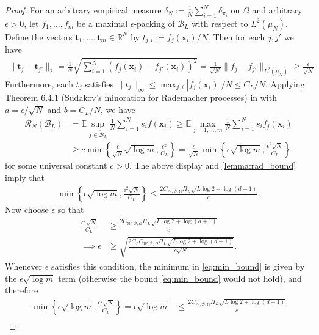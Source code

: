 \documentclass{article}
\def\vt{{\bm{t}}}
\def\vx{{\bm{x}}}
\def\cB{{\mathcal{B}}}
\def\cR{{\mathcal{R}}}
\def\cW{{\mathcal{W}}}
\def\bE{{\mathbb{E}}}
\newcommand{\R}{\mathbb{R}}
\begin{document}
\begin{appendices}
\begin{proof}
    For an arbitrary empirical measure $\delta_N := \frac{1}{N} \sum_{i=1}^N \delta_{\vx_i}$ on $\Omega$ and arbitrary $\epsilon > 0$, let $f_1, \dots, f_m$ be a maximal $\epsilon$-packing of $\cB_L$ with respect to $L^2(\mu_N)$. Define the vectors $\vt_1, \dots, \vt_m \in \R^N$ by $t_{j,i} := f_j(\vx_i)/N$. Then for each $j,j'$ we have
\begin{align}
    \| \vt_j - \vt_{j'} \|_2 = \frac{1}{N} \sqrt{\sum_{i=1}^N \left( f_j(\vx_i) - f_{j'}(\vx_i) \right)^2} = \frac{1}{\sqrt{N}} \| f_j - f_{j'} \|_{L^2(\mu_N)} \geq \frac{\epsilon}{\sqrt{N}}
\end{align}
Furthermore, each $t_j$ satisfies $\| t_j \|_\infty \leq \max_{j,i} |f_j(\vx_i)|/N \leq C_L/N$. Applying Theorem 6.4.1 (Sudakov's minoration for Rademacher processes) in \cite{talagrand2021upper} with $a = \epsilon/\sqrt{N}$ and $b = C_L/N$, we have
\begin{align}
    \cR_N(\cB_L) &= \bE \sup_{f \in \widetilde{\cB}_L} \frac{1}{N} \sum_{i=1}^N s_i f(\vx_i) \geq \bE \max_{j=1, \dots, m} \frac{1}{N} \sum_{i=1}^N s_i f_j(\vx_i) \\
    &\geq c \min \left\{ \frac{\epsilon}{\sqrt{N}} \sqrt{\log m}, \frac{\epsilon^2}{C_L} \right\} = \frac{c}{\sqrt{N}} \min \left\{ \epsilon \sqrt{\log m}, \frac{\epsilon^2 \sqrt{N}}{C_L} \right\}
\end{align}
for some universal constant $c > 0$. The above display and \cref{lemma:rad_bound} imply that
\begin{align} \label{eq:min_bound}
     \min \left\{ \epsilon \sqrt{\log m}, \frac{\epsilon^2 \sqrt{N}}{C_L} \right\} \leq \frac{2 C_{\cW, \cB, \Omega} \Pi_L \sqrt{L \log 2 + \log(d+1)}}{c}.
\end{align}
Now choose $\epsilon$ so that
\begin{align}
    \frac{\epsilon^2 \sqrt{N}}{C_L} &\geq \frac{2 C_{\cW, \cB, \Omega} \Pi_L \sqrt{L \log 2 + \log(d+1)}}{c} \\
    \implies \epsilon &\geq \sqrt{\frac{2 C_L C_{\cW, \cB, \Omega} \Pi_L \sqrt{L \log 2 + \log(d+1)}}{c \sqrt{N}}}. \label{eq:eps_cond_sudakov_homogeneous}
\end{align}
Whenever $\epsilon$ satisfies this condition, the minimum in \eqref{eq:min_bound} is given by the $
\epsilon \sqrt{\log m}$ term (otherwise the bound \eqref{eq:min_bound} would not hold), and therefore
\begin{align}
    \min \left\{ \epsilon \sqrt{\log m}, \frac{\epsilon^2 \sqrt{N}}{C_L} \right\} = \epsilon \sqrt{\log m} &\leq \frac{2 C_{\cW, \cB, \Omega} \Pi_L \sqrt{L \log 2 + \log(d+1)}}{c} \\

\end{align}
\end{proof}
\end{appendices}
\end{document}
